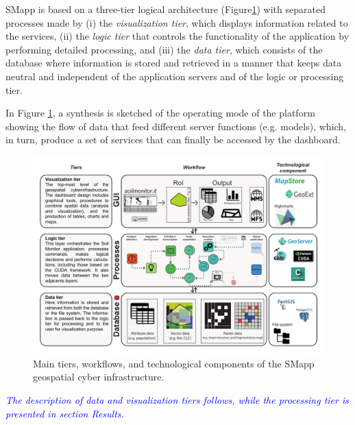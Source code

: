 \documentclass[APA,LATO1COL,doublespace]{WileyNJD-v2}
\newcommand{\update}[1]{\emph{\textcolor{blue}{#1}}}     %
\begin{document}
SMapp is based on a three-tier logical architecture (Figure\ref{fig:GCI}) with separated processes made by (i) the \textit{visualization tier}, which displays information related to the services, (ii) the \textit{logic tier} that controls the functionality of the application by performing detailed processing, and (iii) the \textit{data tier}, which consists of the database where information is stored and retrieved in a manner that keeps data neutral and independent of the application servers and of the logic or processing tier.

In Figure \ref{fig:GCI}, a synthesis is sketched of the operating mode of the platform showing the flow of data that feed different server functions (e.g. models), which, in turn, produce a set of services that can finally be accessed by the dashboard.

\begin{figure}[t]
    \centerline{\includegraphics[width=500pt]{Figure02.pdf}}
    \caption{Main tiers, workflows, and technological components of the SMapp geospatial cyber infrastructure.} \label{fig:GCI}
\end{figure}

\update{The description of data and visualization tiers follows, while the processing tier is presented in section Results.}
\end{document}

